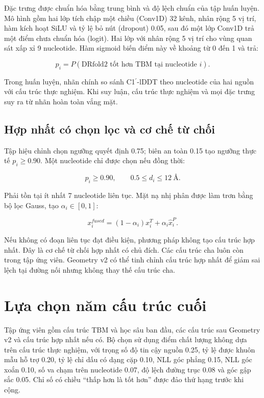 \documentclass[12pt,a4paper,oneside]{report}
\newcommand{\cprime}{C1$^{\prime}$}
\newcommand{\angstrom}{\text{\AA}}
\begin{document}
Đặc trưng được chuẩn hóa bằng trung bình và độ lệch chuẩn của tập huấn luyện. Mô hình
gồm hai lớp tích chập một chiều (Conv1D) 32 kênh, nhân rộng 5 vị trí, hàm kích hoạt
SiLU và tỷ lệ bỏ nút (dropout) 0.05, sau đó một lớp Conv1D trả một điểm chưa chuẩn hóa
(logit). Hai lớp với nhân rộng 5 vị trí cho vùng quan sát xấp xỉ 9 nucleotide. Hàm
sigmoid biến điểm này về khoảng từ 0 đến 1 và trả:

\begin{equation}
p_i=P(\text{DRfold2 tốt hơn TBM tại nucleotide }i).
\end{equation}

Trong huấn luyện, nhãn chính so sánh \cprime{}-lDDT theo nucleotide của hai nguồn với
cấu trúc thực nghiệm. Khi suy luận, cấu trúc thực nghiệm và mọi đặc trưng suy ra từ nhãn
hoàn toàn vắng mặt.

\subsection{Hợp nhất có chọn lọc và cơ chế từ chối}

Tập hiệu chỉnh chọn ngưỡng quyết định 0.75; biên an toàn 0.15 tạo ngưỡng thực tế
$p_i\ge0.90$. Một nucleotide chỉ được chọn nếu đồng thời:

\begin{equation}
p_i\ge0.90,\qquad 0.5\le d_i\le12~\angstrom.
\end{equation}

Phải tồn tại ít nhất 7 nucleotide liên tục. Mặt nạ nhị phân được làm trơn bằng bộ lọc
Gauss, tạo
$\alpha_i\in[0,1]$:

\begin{equation}
x_i^{fused}=(1-\alpha_i)x_i^{T}+\alpha_i\widehat{x}_i^{P}.
\end{equation}

Nếu không có đoạn liên tục đạt điều kiện, phương pháp không tạo cấu trúc hợp nhất. Đây
là cơ chế từ chối hợp nhất có chủ đích. Các cấu trúc cha luôn còn trong tập ứng viên.
Geometry v2 có thể tinh chỉnh cấu trúc hợp nhất để giảm sai lệch tại đường nối nhưng
không thay thế cấu trúc cha.

\section{Lựa chọn năm cấu trúc cuối}

Tập ứng viên gồm cấu trúc TBM và học sâu ban đầu, các cấu trúc sau Geometry v2 và cấu
trúc hợp nhất nếu có. Bộ chọn sử dụng điểm chất lượng không dựa trên cấu trúc thực
nghiệm, với trọng số độ tin cậy nguồn 0.25, tỷ lệ được khuôn mẫu hỗ trợ 0.20, tỷ lệ
chỉ dấu có dạng cặp 0.10, NLL góc phẳng 0.15, NLL góc xoắn 0.10, số va chạm trên
nucleotide 0.07, độ lệch đường trục 0.08 và góc gập sắc 0.05. Chỉ số có chiều
``thấp hơn là tốt hơn'' được
đảo thứ hạng trước khi cộng.
\end{document}
